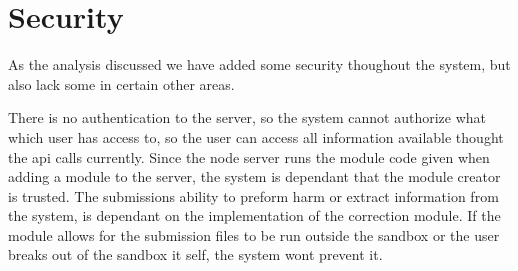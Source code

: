 \chapter{Security}
As the analysis discussed we have added some security thoughout the system, but also lack some in certain other areas.

There is no authentication to the server, so the system cannot authorize what which user has access to, so the user can access all information available thought the api calls currently. Since the node server runs the module code given when adding a module to the server, the system is dependant that the module creator is trusted. The submissions ability to preform harm or extract information from the system, is dependant on the implementation of the correction module. If the module allows for the submission files to be run outside the sandbox or the user breaks out of the sandbox it self, the system wont prevent it.
